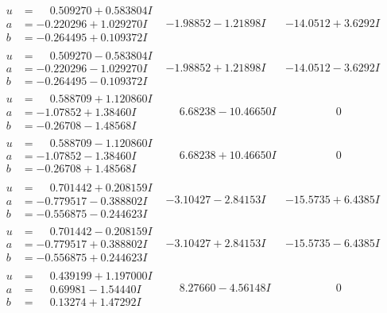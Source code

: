 \documentclass[1p]{elsarticle_modified}
\theoremstyle{definition}
\begin{document}
$$\begin{array}{c|c|c}
\begin{aligned}
u &= \phantom{-}0.509270 + 0.583804 I \\
a &= -0.220296 + 1.029270 I \\
b &= -0.264495 + 0.109372 I\end{aligned}
 & -1.98852 - 1.21898 I & -14.0512 + 3.6292 I \\ \hline\begin{aligned}
u &= \phantom{-}0.509270 - 0.583804 I \\
a &= -0.220296 - 1.029270 I \\
b &= -0.264495 - 0.109372 I\end{aligned}
 & -1.98852 + 1.21898 I & -14.0512 - 3.6292 I \\ \hline\begin{aligned}
u &= \phantom{-}0.588709 + 1.120860 I \\
a &= -1.07852 + 1.38460 I \\
b &= -0.26708 - 1.48568 I\end{aligned}
 & \phantom{-}6.68238 - 10.46650 I & \phantom{-0.000000 } 0 \\ \hline\begin{aligned}
u &= \phantom{-}0.588709 - 1.120860 I \\
a &= -1.07852 - 1.38460 I \\
b &= -0.26708 + 1.48568 I\end{aligned}
 & \phantom{-}6.68238 + 10.46650 I & \phantom{-0.000000 } 0 \\ \hline\begin{aligned}
u &= \phantom{-}0.701442 + 0.208159 I \\
a &= -0.779517 - 0.388802 I \\
b &= -0.556875 - 0.244623 I\end{aligned}
 & -3.10427 - 2.84153 I & -15.5735 + 6.4385 I \\ \hline\begin{aligned}
u &= \phantom{-}0.701442 - 0.208159 I \\
a &= -0.779517 + 0.388802 I \\
b &= -0.556875 + 0.244623 I\end{aligned}
 & -3.10427 + 2.84153 I & -15.5735 - 6.4385 I \\ \hline\begin{aligned}
u &= \phantom{-}0.439199 + 1.197000 I \\
a &= \phantom{-}0.69981 - 1.54440 I \\
b &= \phantom{-}0.13274 + 1.47292 I\end{aligned}
 & \phantom{-}8.27660 - 4.56148 I & \phantom{-0.000000 } 0 \\ \hline\begin{aligned}

\end{aligned}
\end{array}$$
\end{document}
